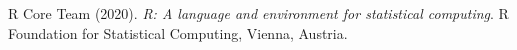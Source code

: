 \documentclass[final]{beamer}
\begin{document}
\begin{frame}[t]
\begin{multicols}{2}
\begin{thebibliography}{99}
 R Core Team (2020). \textit{R: A language and environment for statistical computing}. R Foundation for Statistical Computing, Vienna, Austria.

\end{thebibliography}

\end{multicols}

\end{frame}
\end{document}
